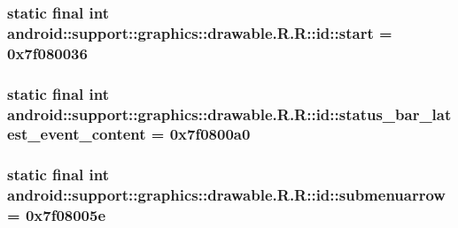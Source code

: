 \hypertarget{classandroid_1_1support_1_1graphics_1_1drawable_1_1_r_1_1id_53c1677409b02e30a953ce4712fef78d}{
\subsubsection[{start}]{\setlength{\rightskip}{0pt plus 5cm}static final int android::support::graphics::drawable.R.R::id::start = 0x7f080036}}
\label{classandroid_1_1support_1_1graphics_1_1drawable_1_1_r_1_1id_53c1677409b02e30a953ce4712fef78d}


\hypertarget{classandroid_1_1support_1_1graphics_1_1drawable_1_1_r_1_1id_d48e1c72968a428927f77813097b0a4c}{
\subsubsection[{status\_\-bar\_\-latest\_\-event\_\-content}]{\setlength{\rightskip}{0pt plus 5cm}static final int android::support::graphics::drawable.R.R::id::status\_\-bar\_\-latest\_\-event\_\-content = 0x7f0800a0}}
\label{classandroid_1_1support_1_1graphics_1_1drawable_1_1_r_1_1id_d48e1c72968a428927f77813097b0a4c}


\hypertarget{classandroid_1_1support_1_1graphics_1_1drawable_1_1_r_1_1id_2955d193b538c4e0122daaee0831109b}{
\subsubsection[{submenuarrow}]{\setlength{\rightskip}{0pt plus 5cm}static final int android::support::graphics::drawable.R.R::id::submenuarrow = 0x7f08005e}}
\label{classandroid_1_1support_1_1graphics_1_1drawable_1_1_r_1_1id_2955d193b538c4e0122daaee0831109b}


